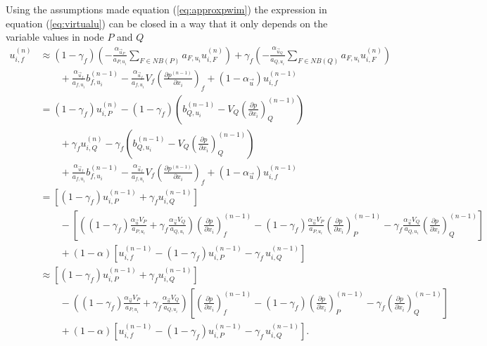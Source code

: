   Using the assumptions made equation (\ref{eq:approxpwim}) the expression in equation (\ref{eq:virtualu}) can be closed in a way that it only depends on the variable values in node \(P\) and \(Q\)
  \begin{align}
    u_{i,f}^{(n)} 
    &\approx 
    \left(1-\gamma_f\right)  \left( -\frac{\alpha_{\vec{u}_P}}{a_{P,u_i}} \sum_{F \in NB(P)} a_{F,u_i} u_{i,F}^{(n)} \right)
    +\gamma_f  \left( -\frac{\alpha_{\vec{u}_Q}}{a_{Q,u_i}} \sum_{F \in NB(Q)} a_{F,u_i} u_{i,F}^{(n)}  \right) \nonumber \\[1em]
    &\quad\quad+ \frac{\alpha_{\vec{u}_f}}{a_{f,u_i}}b_{f,u_i}^{(n-1)} 
    - \frac{\alpha_{\vec{u}_f}}{a_{f,u_i}}V_f\left(\frac{\partial p^{(n-1)}}{\partial x_i}\right)_f 
    + \left(1 - \alpha_{\vec{u}}\right) u_{i,f}^{(n-1)} \nonumber \\[1em]
    &=
    \left(1-\gamma_f\right) u_{i,P}^{(n)} - \left(1 - \gamma_f\right) \left(  b_{Q,u_i}^{(n-1)} - V_Q \left(\frac{\partial p}{\partial x_i}\right)_Q^{(n-1)} \right) \nonumber \\[1em]
    &\quad\quad+\gamma_f  u_{i,Q}^{(n)} - \gamma_f\left( b_{Q,u_i}^{(n-1)} - V_Q \left(\frac{\partial p}{\partial x_i}\right)_Q^{(n-1)}  \right) \nonumber \\[1em]
    &\quad\quad+ \frac{\alpha_{\vec{u}_f}}{a_{f,u_i}}b_{f,u_i}^{(n-1)} 
    - \frac{\alpha_{\vec{u}_f}}{a_{f,u_i}}V_f\left(\frac{\partial p^{(n-1)}}{\partial x_i}\right)_f 
    + \left(1 - \alpha_{\vec{u}}\right) u_{i,f}^{(n-1)} \nonumber\\[1em]
    &=
    \left[\left(1 - \gamma_f\right) u_{i,P}^{(n-1)} + \gamma_f u_{i,Q}^{(n-1)} \right] \nonumber\\[1em]
    &\quad\quad - 
    \left[ 
    \left(\left(1 - \gamma_f\right) \frac{\alpha_\vec{u} V_P}{a_{P,u_i}} + \gamma_f \frac{\alpha_\vec{u} V_Q}{a_{Q,u_i}}\right)
    \left(\frac{\partial p}{\partial x_i}\right)_f^{(n-1)} 
    - \left(1 - \gamma_f \right) \frac{\alpha_\vec{u} V_P}{a_{P,u_i}}\left( \frac{\partial p}{\partial x_i} \right)_P^{(n-1)} 
    - \gamma_f \frac{\alpha_\vec{u} V_Q}{a_{Q,u_i}}\left(\frac{\partial p}{\partial x_i}\right)_Q^{(n-1)}
    \right] \nonumber \\[1em]
    &\quad\quad + \left(1 - \alpha\right) \left[ u_{i,f}^{(n-1)} - \left(1 - \gamma_f\right) u_{i,P}^{(n-1)} - \gamma_f \, u_{i,Q}^{(n-1)} \right] \nonumber \\[1em]
    &\approx
    \left[\left(1 - \gamma_f\right) u_{i,P}^{(n-1)} + \gamma_f u_{i,Q}^{(n-1)} \right] \nonumber\\[1em]
    &\quad\quad - 
    \left(\left(1 - \gamma_f\right) \frac{\alpha_\vec{u} V_P}{a_{P,u_i}} + \gamma_f \frac{\alpha_\vec{u} V_Q}{a_{Q,u_i}}\right)
    \left[ 
    \left(\frac{\partial p}{\partial x_i}\right)_f^{(n-1)} 
    - \left(1 - \gamma_f \right) \left( \frac{\partial p}{\partial x_i} \right)_P^{(n-1)} 
    - \gamma_f \left(\frac{\partial p}{\partial x_i}\right)_Q^{(n-1)}
    \right] \nonumber \\[1em]
    &\quad\quad + \left(1 - \alpha\right) \left[ u_{i,f}^{(n-1)} - \left(1 - \gamma_f\right) u_{i,P}^{(n-1)} - \gamma_f \, u_{i,Q}^{(n-1)} \right].
  \end{align}

